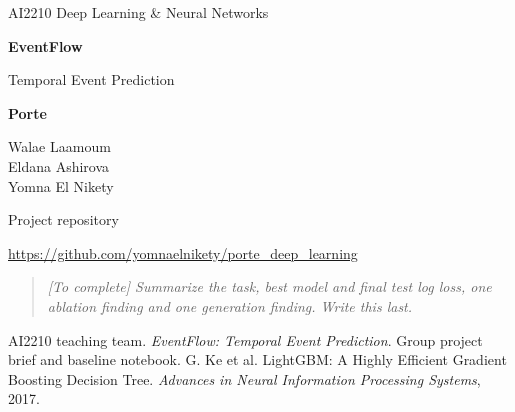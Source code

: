 \documentclass[11pt,a4paper]{article}
\newcommand{\teamname}{Porte}
\newcommand{\studentnames}{Walae Laamoum \\ Eldana Ashirova \\ Yomna El Nikety}
\newcommand{\projectrepo}{\url{https://github.com/yomnaelnikety/porte_deep_learning}}
\newcommand{\todo}[1]{\par\smallskip\noindent\textcolor{blue!65!black}{\textit{[To complete] #1}}\par\smallskip}
\begin{document}
\hypersetup{pageanchor=false}
\begin{titlepage}
\centering
\vspace*{30mm}
{\Large AI2210 \textbar{} Deep Learning \& Neural Networks\par}
\vspace{15mm}
{\Huge\bfseries EventFlow\par}
\vspace{3mm}
{\LARGE Temporal Event Prediction\par}
\vspace{19mm}
{\large\bfseries \teamname\par}
\vspace{5mm}
{\large\studentnames\par}
\vfill
{\small Project repository\par\projectrepo\par}
\end{titlepage}
\hypersetup{pageanchor=true}

\begin{abstract}
\todo{Summarize the task, best model and final test log loss, one ablation finding and one generation finding. Write this last.}
\end{abstract}








\clearpage
\begin{thebibliography}{9}
 AI2210 teaching team. \emph{EventFlow: Temporal Event Prediction}. Group project brief and baseline notebook.
 G. Ke et al. LightGBM: A Highly Efficient Gradient Boosting Decision Tree. \emph{Advances in Neural Information Processing Systems}, 2017.
\end{thebibliography}
\end{document}
